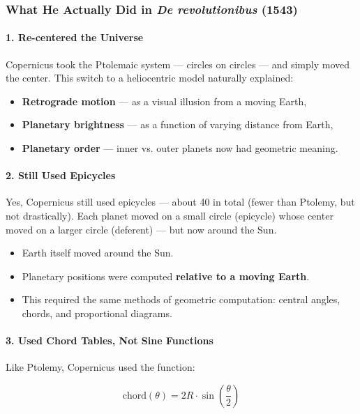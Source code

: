 \subsubsection*{What He Actually Did in \textit{De revolutionibus} (1543)}

\paragraph{1. Re-centered the Universe}

Copernicus took the Ptolemaic system — circles on circles — and simply moved the center. This switch to a heliocentric model naturally explained:

\begin{itemize}
  \item \textbf{Retrograde motion} — as a visual illusion from a moving Earth,
  \item \textbf{Planetary brightness} — as a function of varying distance from Earth,
  \item \textbf{Planetary order} — inner vs. outer planets now had geometric meaning.
\end{itemize}

\paragraph{2. Still Used Epicycles}

Yes, Copernicus still used epicycles — about 40 in total (fewer than Ptolemy, but not drastically). Each planet moved on a small circle (epicycle) whose center moved on a larger circle (deferent) — but now around the Sun.

\begin{itemize}
  \item Earth itself moved around the Sun.
  \item Planetary positions were computed \textbf{relative to a moving Earth}.
  \item This required the same methods of geometric computation: central angles, chords, and proportional diagrams.
\end{itemize}

\paragraph{3. Used Chord Tables, Not Sine Functions}

Like Ptolemy, Copernicus used the function:

\[
\text{chord}(\theta) = 2R \cdot \sin\left(\frac{\theta}{2}\right)
\]


